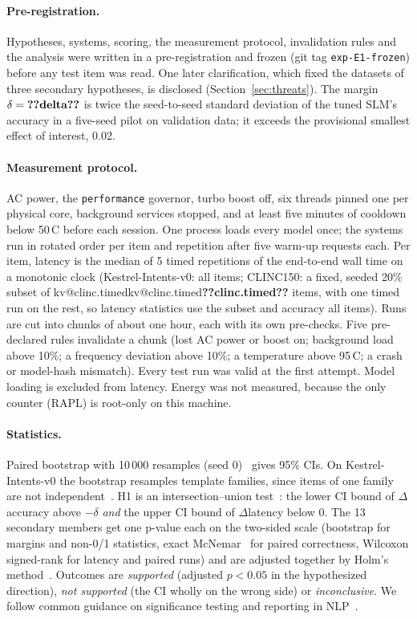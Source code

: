 \documentclass[11pt,a4paper]{article}
\makeatletter
\DeclareRobustCommand{\kv}[1]{\ifcsname kv@#1\endcsname\csname kv@#1\endcsname\else\textbf{??#1??}\fi}
\makeatother
\begin{document}
\paragraph{Pre-registration.} Hypotheses, systems, scoring, the measurement protocol, invalidation rules and the
analysis were written in a pre-registration and frozen (git tag \texttt{exp-E1-frozen}) before any test item was read.
One later clarification, which fixed the datasets of three secondary hypotheses, is disclosed
(Section~\ref{sec:threats}). The margin $\delta=\kv{delta}$ is twice the seed-to-seed standard deviation of the tuned
SLM's accuracy in a five-seed pilot on validation data; it exceeds the provisional smallest effect of interest, 0.02.

\paragraph{Measurement protocol.} AC power, the \texttt{performance} governor, turbo boost off, six threads pinned
one per physical core, background services stopped, and at least five minutes of cooldown below 50\,\textdegree C
before each session. One process loads every model once; the systems run in rotated order per item and repetition
after five warm-up requests each. Per item, latency is the median of 5 timed repetitions of the end-to-end wall time
on a monotonic clock (Kestrel-Intents-v0: all items; CLINC150: a fixed, seeded 20\% subset of
\kv{clinc.timed} items, with one timed run on the rest, so latency statistics use the subset and accuracy all items).
Runs are cut into chunks of about one hour, each with its own pre-checks. Five pre-declared rules invalidate a chunk
(lost AC power or boost on; background load above 10\%; a frequency deviation above 10\%; a temperature above
95\,\textdegree C; a crash or model-hash mismatch). Every test run was valid at the first attempt. Model loading is
excluded from latency. Energy was not measured, because the only counter (RAPL) is root-only on this machine.

\paragraph{Statistics.} Paired bootstrap with 10\,000 resamples (seed 0)~\citep{efron1993bootstrap} gives 95\% CIs. On
Kestrel-Intents-v0 the bootstrap resamples template families, since items of one family are not
independent~\citep{field2007cluster}. H1 is an intersection--union test~\citep{berger1982iut}: the lower CI bound of
$\Delta$accuracy above $-\delta$ \emph{and} the upper CI bound of $\Delta$latency below 0. The 13 secondary members get
one p-value each on the two-sided scale (bootstrap for margins and non-0/1 statistics, exact
McNemar~\citep{mcnemar1947} for paired correctness, Wilcoxon signed-rank for latency and paired runs) and are adjusted
together by Holm's method~\citep{holm1979}. Outcomes are \emph{supported} (adjusted $p<0.05$ in the hypothesized
direction), \emph{not supported} (the CI wholly on the wrong side) or \emph{inconclusive}. We follow common guidance on
significance testing and reporting in NLP~\citep{dror2018hitchhiker,dodge2019showyourwork}.
\end{document}
